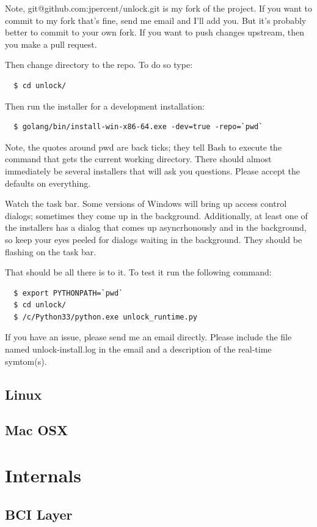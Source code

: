 \documentclass[11pt]{article}
\begin{document}
Note, git@github.com:jpercent/unlock.git is my fork of the project.  If you want to commit to my fork that's fine, send me email and I'll add you.  But it's probably better to commit to your own fork.  If you want to push changes upstream, then you make a pull request.  

Then change directory to the repo.  To do so type:
\begin{verbatim}
  $ cd unlock/
\end{verbatim}

Then run the installer for a development installation:
\begin{verbatim}
  $ golang/bin/install-win-x86-64.exe -dev=true -repo=`pwd`
\end{verbatim}

Note, the quotes around pwd are back ticks; they tell Bash to execute the command that gets the current working directory.  There should almost immediately be several installers that will ask you questions.  Please accept the defaults on everything.  

Watch the task bar.  Some versions of Windows will bring up access control dialogs; sometimes they come up in the background.  Additionally, at least one of the installers has a dialog that comes up asyncrhonously and in the background, so keep your eyes peeled for dialogs waiting in the background.  They should be flashing on the task bar.

That should be all there is to it.  To test it run the following command:

\begin{verbatim}
  $ export PYTHONPATH=`pwd`
  $ cd unlock/
  $ /c/Python33/python.exe unlock_runtime.py
\end{verbatim} 

If you have an issue, please send me an email directly.  Please include the file named unlock-install.log in the email and a description of the real-time symtom(s).  
 
\subsection{Linux}
\subsection{Mac OSX}
\section{Internals}
\subsection{BCI Layer}\label{bcisec}
\end{document}
